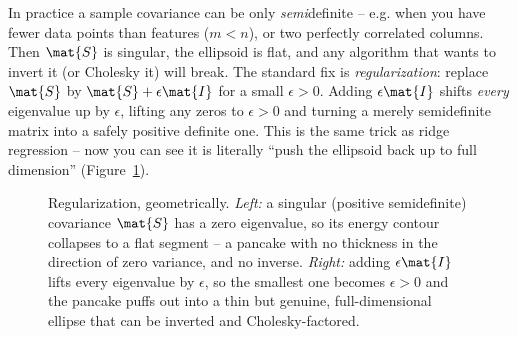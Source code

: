 \begin{trapbox}
In practice a sample covariance can be only \emph{semi}definite -- e.g. when you have fewer data
points than features ($m<n$), or two perfectly correlated columns. Then $\mat{S}$ is singular, the
ellipsoid is flat, and any algorithm that wants to invert it (or Cholesky it) will break. The
standard fix is \emph{regularization}: replace $\mat{S}$ by $\mat{S} + \epsilon\mat{I}$ for a small
$\epsilon>0$. Adding $\epsilon\mat{I}$ shifts \emph{every} eigenvalue up by $\epsilon$, lifting any
zeros to $\epsilon>0$ and turning a merely semidefinite matrix into a safely positive definite one.
This is the same trick as ridge regression -- now you can see it is literally ``push the ellipsoid
back up to full dimension'' (Figure~\ref{ch27:fig-regularize}).
\end{trapbox}

\begin{figure}[H]
\centering
{}\hspace{1.2cm}
\caption{Regularization, geometrically. \emph{Left:} a singular (positive semidefinite) covariance
$\mat{S}$ has a zero eigenvalue, so its energy contour collapses to a flat segment -- a pancake with
no thickness in the direction of zero variance, and no inverse. \emph{Right:} adding $\epsilon\mat{I}$
lifts every eigenvalue by $\epsilon$, so the smallest one becomes $\epsilon>0$ and the pancake puffs
out into a thin but genuine, full-dimensional ellipse that can be inverted and Cholesky-factored.}
\label{ch27:fig-regularize}
\end{figure}

